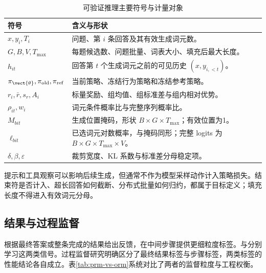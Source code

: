 \documentclass[../textbook.tex]{subfiles}
\begin{document}
\begin{table}[htbp]
\centering
\caption{可验证推理主要符号与计量对象}
\label{tab:verifiable-symbols}
\begin{tabular}{ll}
\toprule 符号 & 含义与形状\\\midrule
$x,y_i,T_i$ & 问题、第 $i$ 条回答及其有效生成词元数。\\
$G,B,V,T_{\max}$ & 每题候选数、问题批量、词表大小、填充后最大长度。\\
$h_{it}$ & 回答第 $t$ 个生成词元之前的可见历史 $(x,y_{i,<t})$。\\
$\pi_{\vect{\theta}},\pi_{\mathrm{old}},\pi_{\mathrm{ref}}$ & 当前策略、冻结行为策略和冻结参考策略。\\
$r_i,\bar r,s_r,A_i$ & 标量奖励、组均值、组标准差与组内相对优势。\\
$\rho_{it},w_i$ & 词元条件概率比与完整序列概率比。\\
$M_{bit}$ & 生成位置掩码，形状 $B\times G\times T_{\max}$；有效位置为1。\\
$\ell_{bit}$ & 已选词元对数概率，与掩码同形；完整 logits 为 $B\times G\times T_{\max}\times V$。\\
$\delta,\beta,\varepsilon$ & 裁剪宽度、KL 系数与标准差分母稳定项。\\
\bottomrule
\end{tabular}
\end{table}

提示和工具观察可以影响后续生成，但通常不作为模型采样动作计入策略损失。结束符是否计入、超长回答如何截断、分布式批量如何归约，都属于目标定义；填充长度不得进入有效词元分母。

\subsection{结果与过程监督}
根据最终答案或整条完成的结果给出反馈，在中间步骤提供更细粒度标签。与分别学习这两类信号。过程监督研究明确区分了最终结果标签与步骤标签，两类标签的性能结论各自成立。\cite{lightman2023verify}表\ref{tab:prm-vs-orm}系统对比了两者的监督粒度与工程权衡。
\end{document}
